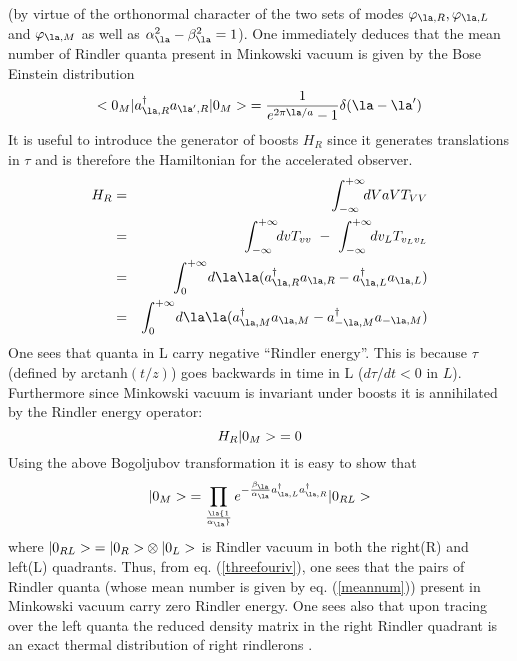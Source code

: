 (by virtue of the orthonormal character of the two sets of modes
$\varphi_{\la,R} ,\varphi_{\la,L}$ and $\varphi_{\la , M}$ as well as
$\alpha_{\la}^2 -\beta_{\la}^2 = 1 $).
One immediately deduces that the mean number of Rindler quanta present in
Minkowski vacuum is given by the Bose Einstein distribution
\begin{equation}
\bra{0_M} a_{\la,R}^{\dagger} a_{\la^{\prime},R} \ket{0_M} = {1 \over
e^{2 \pi \la /a} - 1} \delta (\la - \la^{\prime})
\label{meannum}
\end{equation}
It is useful to introduce the generator of boosts $ H_R $ since
it generates translations in $\tau$ and is therefore the Hamiltonian for
the accelerated observer.
\begin{eqnarray} H_R &=& \int_{-\infty}^{+\infty}\!\! dV
 aV T_{VV} \nonumber\\
&=& \int_{-\infty}^{+\infty}\!\! dv T_{vv} \ -
\   \int_{-\infty}^{+\infty}\!\! dv_L T_{v_Lv_L} \nonumber\\
&=& \int_0^{+\infty}\!
d\la \la (a_{\la,R}^\dagger a_{\la,R} - a_{\la,L}^\dagger a_{\la,L})
\nonumber\\
&=& \int_{0}^{+\infty}\!
d\la \la (a_{\la,M}^\dagger a_{\la,M} - a_{-\la,M}^\dagger a_{-\la,M})
\label{threefouriv} \end{eqnarray}
One sees that quanta in L carry
negative ``Rindler energy''. This is because $\tau$ (defined by arctanh$(t/z)$)
 goes backwards in time in L ($d
\tau / dt <0$ in $L$).
Furthermore since Minkowski vacuum
is invariant under boosts it is annihilated by the Rindler energy operator:
\begin{equation}
H_R\mbox{$ \vert 0_M > $}=0
\label{threefouriv2}
\end{equation}
Using the above Bogoljubov transformation it is easy to show that
\begin{equation} \ket{0_M} = \prod_\la {1 \over \alpha_\la} e^{-{ \beta_\la
\over \alpha_\la} a^\dagger_{\la,L} a^\dagger_{\la,R}} \ket{0_{RL}}
\label{threethreexiii} \end{equation}
where $\mbox{$ \vert 0_{RL} > $}= \mbox{$ \vert 0_{R} > $} \otimes\mbox{$ \vert 0_{L} > $}$ is Rindler vacuum in
both the right(R) and left(L) quadrants.
Thus, from eq. (\ref{threefouriv}), one sees that the
 pairs of Rindler quanta (whose mean number is given by eq. (\ref{meannum}))
present in Minkowski vacuum carry zero Rindler energy.
One sees also that upon tracing over the left quanta the
reduced density matrix in the right Rindler quadrant is an exact thermal
distribution of right rindlerons \cite{birreld}.

